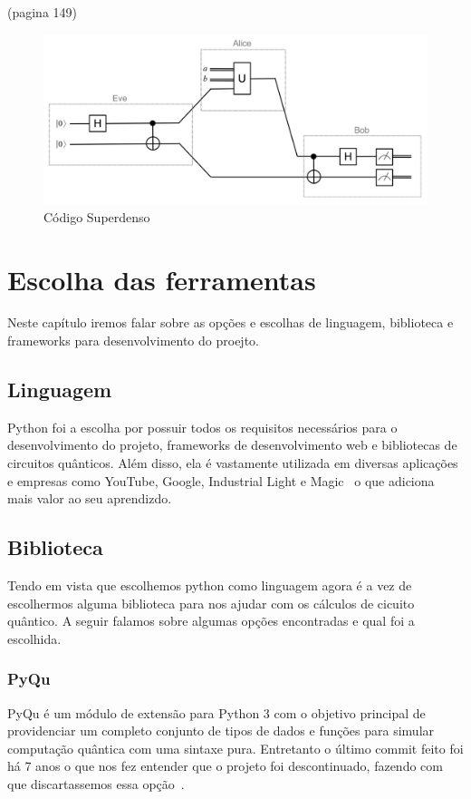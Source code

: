 \documentclass[a4paper, 12pt, oneside]{book}
\begin{document}
(pagina 149)
\begin{figure}[H]
\centering
\includegraphics[scale=0.38]{superdenso.jpg}
\caption{Código Superdenso}
\end{figure}


\chapter{Escolha das ferramentas}
\thispagestyle{empty} 


Neste capítulo iremos falar sobre as opções e escolhas de linguagem, biblioteca e frameworks para desenvolvimento do proejto. 

\section{Linguagem}

Python foi a escolha por possuir todos os requisitos necessários para o desenvolvimento do projeto, frameworks de desenvolvimento web e bibliotecas de circuitos quânticos. Além disso, ela é vastamente utilizada em diversas aplicações e empresas como YouTube, Google, Industrial Light e Magic~\cite{pythonquotes} o que adiciona mais valor ao seu aprendizdo.

\section{Biblioteca}

Tendo em vista que escolhemos python como linguagem agora é a vez de escolhermos alguma biblioteca para nos ajudar com os cálculos de cicuito quântico. A seguir falamos sobre algumas opções encontradas e qual foi a escolhida.
\subsection{PyQu}
PyQu é um módulo de extensão para Python 3 com o objetivo principal de providenciar um completo conjunto de tipos de dados e funções para simular computação quântica com uma sintaxe pura. Entretanto o último commit feito foi há 7 anos o que nos fez entender que o projeto foi descontinuado, fazendo com que discartassemos essa opção~\cite{pyqu}.
\end{document}
